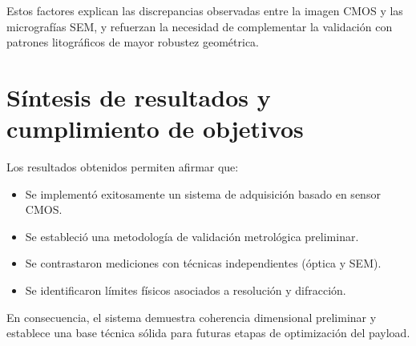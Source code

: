 Estos factores explican las discrepancias observadas entre la imagen CMOS y las micrografías SEM, y refuerzan la necesidad de complementar la validación con patrones litográficos de mayor robustez geométrica.
\section{Síntesis de resultados y cumplimiento de objetivos}

Los resultados obtenidos permiten afirmar que:

\begin{itemize}
    \item Se implementó exitosamente un sistema de adquisición basado en sensor CMOS.
    \item Se estableció una metodología de validación metrológica preliminar.
    \item Se contrastaron mediciones con técnicas independientes (óptica y SEM).
    \item Se identificaron límites físicos asociados a resolución y difracción.
\end{itemize}

En consecuencia, el sistema demuestra coherencia dimensional preliminar y establece una base técnica sólida para futuras etapas de optimización del payload.
